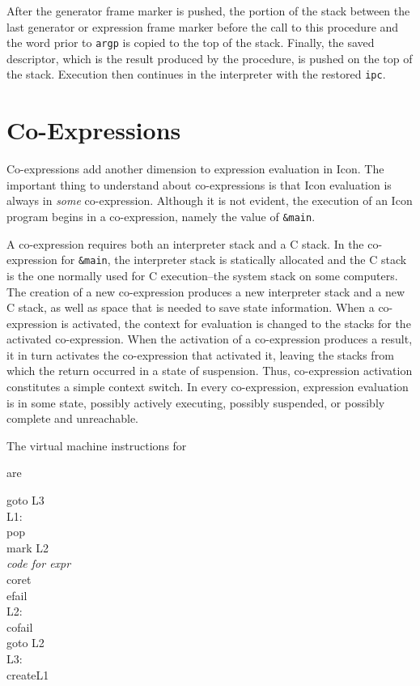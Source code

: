 After the generator frame marker is pushed, the portion of the stack
between the last generator or expression frame marker before the call
to this procedure and the word prior to \texttt{argp} is copied to the
top of the stack.  Finally, the saved descriptor, which is the result
produced by the procedure, is pushed on the top of the stack.
Execution then continues in the interpreter with the restored
\texttt{ipc}.

\section{Co-Expressions}

Co-expressions add another dimension to expression evaluation in
Icon. The important thing to understand about co-expressions is that
Icon evaluation is always in \textit{some }co-expression. Although it
is not evident, the execution of an Icon program begins in a
co-expression, namely the value of \texttt{\&main}.

A co-expression requires both an interpreter stack and a C stack. In
the co-expression for \texttt{\&main}, the interpreter stack is
statically allocated and the C stack is the one normally used for C
execution--the {\textquotedbl}system stack{\textquotedbl} on some
computers. The creation of a new co-expression produces a new
interpreter stack and a new C stack, as well as space that is needed
to save state information. When a co-expression is activated, the
context for evaluation is changed to the stacks for the activated
co-expression. When the activation of a co-expression produces a
result, it in turn activates the co-expression that activated it,
leaving the stacks from which the return occurred in a state of
suspension. Thus, co-expression activation constitutes a simple
context switch.  In every co-expression, expression evaluation is in
some state, possibly actively executing, possibly suspended, or
possibly complete and unreachable.


The virtual machine instructions for


are

\begin{iconcode}
\>\>goto\>\>\>\> L3\\
L1:\\
\>\>pop\\
\>\>mark\>\>\>\> L2\\
\>\>\textit{code for expr}\\
\>\>coret\\
\>\>efail\\
L2:\\
\>\>cofail\\
\>\>goto\>\>\>\> L2\\
L3:\\
\>\>create\>\>\>\>L1
\end{iconcode}


